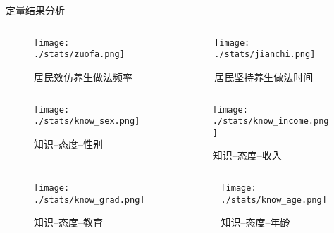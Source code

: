 \begin{frame}[allowframebreaks]{定量结果分析}
    \begin{columns}
    \begin{column}{0.5\textwidth}
        \begin{figure}[h]
            \texttt{[image: ./stats/zuofa.png]}
            \caption{居民效仿养生做法频率}
        \end{figure}
    \end{column}
    \begin{column}{0.5\textwidth}
        \begin{figure}[h]
            \texttt{[image: ./stats/jianchi.png]}
            \caption{居民坚持养生做法时间}
        \end{figure} 
    \end{column}
\end{columns}


    \begin{columns}
    \begin{column}{0.5\textwidth}
        \begin{figure}[h]
            \caption{知识--态度--性别}
            \texttt{[image: ./stats/know\_sex.png]}
            
        \end{figure}
           
    \end{column}
    \begin{column}{0.5\textwidth}
        \begin{figure}[h]
            \caption{知识--态度--收入}
           \texttt{[image: ./stats/know\_income.png]}
           
       \end{figure}
    \end{column}
\end{columns}

    \begin{columns}
    \begin{column}{0.5\textwidth}
        \begin{figure}[h]
             \caption{知识--态度--教育}
            \texttt{[image: ./stats/know\_grad.png]}
           
        \end{figure}
        
    \end{column}
    \begin{column}{0.5\textwidth}
        \begin{figure}[h] 
            \caption{知识--态度--年龄}
            \texttt{[image: ./stats/know\_age.png]}
        \end{figure}
    \end{column}
\end{columns}


\end{frame}
